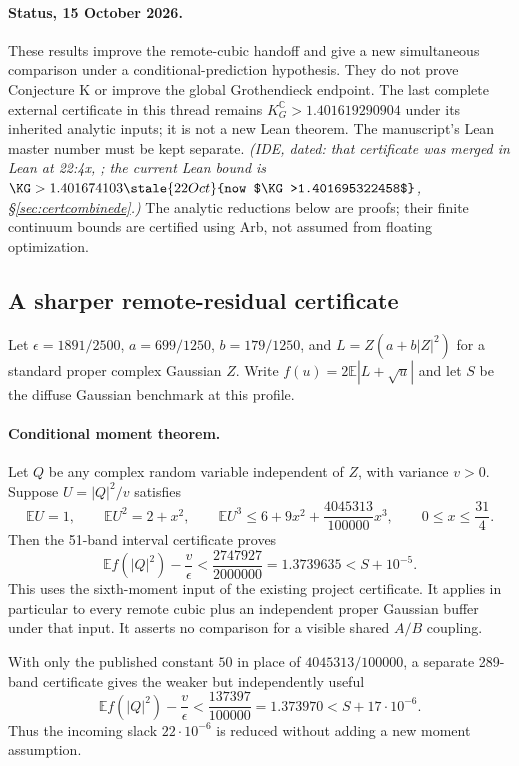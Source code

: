 \paragraph{Status, 15 October 2026.}
These results improve the remote-cubic handoff and give a new simultaneous
comparison under a conditional-prediction hypothesis. They do not prove
Conjecture K or improve the global Grothendieck endpoint. The last complete
external certificate in this thread remains $K_G^{\mathbb C}>1.401619290904$
under its inherited analytic inputs; it is not a new Lean theorem.
The manuscript's Lean master number must be kept separate.
\emph{(IDE, dated: that certificate was merged in Lean at 22:4x, ; the current Lean bound is $\KG>1.401674103\stale{22 Oct}{now $\KG>1.401695322458$}$, \S\ref{sec:certcombinede}.)}
The analytic reductions below are proofs; their finite continuum bounds
are certified using Arb, not assumed from floating optimization.

\subsection{A sharper remote-residual certificate}
Let $\epsilon=1891/2500$, $a=699/1250$, $b=179/1250$, and
$L=Z(a+b|Z|^2)$ for a standard proper complex Gaussian $Z$.
Write $f(u)=2\mathbb E|L+\sqrt u|$ and let $S$ be the diffuse
Gaussian benchmark at this profile.

\paragraph{Conditional moment theorem.}
Let $Q$ be any complex random variable independent of $Z$, with variance $v>0$.
Suppose $U=|Q|^2/v$ satisfies
\[
 \mathbb EU=1,\qquad \mathbb EU^2=2+x^2,\qquad
 \mathbb EU^3\le 6+9x^2+\frac{4045313}{100000}x^3,
 \qquad 0\le x\le\frac{31}{4}.
\]
Then the 51-band interval certificate proves
\[
 \mathbb E f(|Q|^2)-\frac v\epsilon
 <\frac{2747927}{2000000}=1.3739635<S+10^{-5}.
\]
This uses the sixth-moment input of the existing project certificate.
It applies in particular to every remote cubic plus an independent proper
Gaussian buffer under that input. It asserts no comparison for a visible
shared $A/B$ coupling.

With only the published constant $50$ in place of $4045313/100000$,
a separate 289-band certificate gives the weaker but independently useful
\[
 \mathbb E f(|Q|^2)-\frac v\epsilon
 <\frac{137397}{100000}=1.373970<S+17\cdot10^{-6}.
\]
Thus the incoming slack $22\cdot10^{-6}$ is reduced without adding a new
moment assumption.

